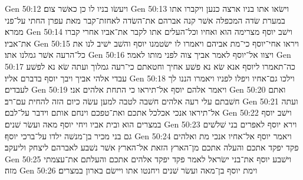 Gen 50:12  ויעשׂו בניו לו כן כאשׁר צום׃
Gen 50:13  וישׂאו אתו בניו ארצה כנען ויקברו אתו במערת שׂדה המכפלה אשׁר קנה אברהם את־השׂדה לאחזת־קבר מאת עפרן החתי על־פני ממרא׃
Gen 50:14  וישׁב יוסף מצרימה הוא ואחיו וכל־העלים אתו לקבר את־אביו אחרי קברו את־אביו׃
Gen 50:15  ויראו אחי־יוסף כי־מת אביהם ויאמרו לו ישׂטמנו יוסף והשׁב ישׁיב לנו את כל־הרעה אשׁר גמלנו אתו׃
Gen 50:16  ויצוו אל־יוסף לאמר אביך צוה לפני מותו לאמר׃
Gen 50:17  כה־תאמרו ליוסף אנא שׂא נא פשׁע אחיך וחטאתם כי־רעה גמלוך ועתה שׂא נא לפשׁע עבדי אלהי אביך ויבך יוסף בדברם אליו׃
Gen 50:18  וילכו גם־אחיו ויפלו לפניו ויאמרו הננו לך לעבדים׃
Gen 50:19  ויאמר אלהם יוסף אל־תיראו כי התחת אלהים אני׃
Gen 50:20  ואתם חשׁבתם עלי רעה אלהים חשׁבה לטבה למען עשׂה כיום הזה להחית עם־רב׃
Gen 50:21  ועתה אל־תיראו אנכי אכלכל אתכם ואת־טפכם וינחם אותם וידבר על־לבם׃
Gen 50:22  וישׁב יוסף במצרים הוא ובית אביו ויחי יוסף מאה ועשׂר שׁנים׃
Gen 50:23  וירא יוסף לאפרים בני שׁלשׁים גם בני מכיר בן־מנשׁה ילדו על־ברכי יוסף׃
Gen 50:24  ויאמר יוסף אל־אחיו אנכי מת ואלהים פקד יפקד אתכם והעלה אתכם מן־הארץ הזאת אל־הארץ אשׁר נשׁבע לאברהם ליצחק וליעקב׃
Gen 50:25  וישׁבע יוסף את־בני ישׂראל לאמר פקד יפקד אלהים אתכם והעלתם את־עצמתי מזה׃
Gen 50:26  וימת יוסף בן־מאה ועשׂר שׁנים ויחנטו אתו ויישׂם בארון במצרים׃


